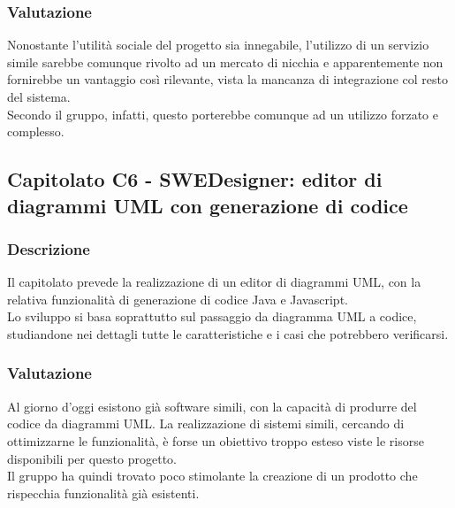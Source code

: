 \subsubsection{Valutazione}
Nonostante l'utilità sociale del progetto sia innegabile, l'utilizzo di un servizio simile sarebbe comunque rivolto ad un mercato di nicchia e apparentemente non fornirebbe un vantaggio così rilevante, vista la mancanza di integrazione col resto del sistema.\\
Secondo il gruppo, infatti, questo porterebbe comunque ad un utilizzo forzato e complesso.

\subsection{Capitolato C6 - SWEDesigner: editor di diagrammi UML con generazione di codice}
\subsubsection{Descrizione}
Il capitolato prevede la realizzazione di un editor di diagrammi UML, con la relativa funzionalità di generazione di codice Java e Javascript.\\
Lo sviluppo si basa soprattutto sul passaggio da diagramma UML a codice, studiandone nei dettagli tutte le caratteristiche e i casi che potrebbero verificarsi.

\subsubsection{Valutazione}
Al giorno d'oggi esistono già software simili, con la capacità di produrre del codice da diagrammi UML. La realizzazione di sistemi simili, cercando di ottimizzarne le funzionalità, è forse un obiettivo troppo esteso viste le risorse disponibili per questo progetto.\\
Il gruppo ha quindi trovato poco stimolante la creazione di un prodotto che rispecchia funzionalità già esistenti.
